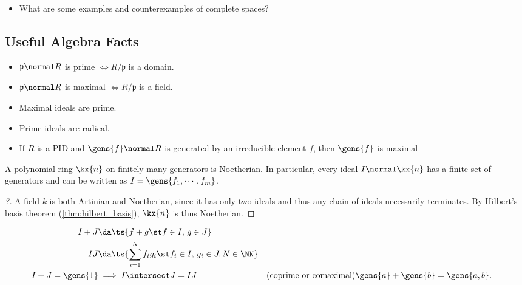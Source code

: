 \begin{itemize}
  \begin{itemize}
  \tightlist
  \item
    What are some examples and counterexamples of complete spaces?
  \end{itemize}
\end{itemize}

\newpage

\hypertarget{useful-algebra-facts}{%
\subsection{Useful Algebra Facts}\label{useful-algebra-facts}}

\begin{fact}

\envlist

\begin{itemize}
\tightlist
\item
  \(\mathfrak{p}\normal R\) is prime \(\iff R/\mathfrak{p}\) is a
  domain.
\item
  \(\mathfrak{p}\normal R\) is maximal \(\iff R/\mathfrak{p}\) is a
  field.
\item
  Maximal ideals are prime.
\item
  Prime ideals are radical.
\item
  If \(R\) is a PID and \(\gens{f} \normal R\) is generated by an
  irreducible element \(f\), then \(\gens{f}\) is maximal
\end{itemize}

\end{fact}

\begin{proposition}

A polynomial ring \(\kx{n}\) on finitely many generators is Noetherian.
In particular, every ideal \(I\normal \kx{n}\) has a finite set of
generators and can be written as \(I = \gens{f_1, \cdots, f_m}\).

\end{proposition}

\begin{proof}[?]

A field \(k\) is both Artinian and Noetherian, since it has only two
ideals and thus any chain of ideals necessarily terminates. By Hilbert's
basis theorem (\cref{thm:hilbert_basis}), \(\kx{n}\) is thus Noetherian.

\end{proof}

\begin{proposition}

\begin{align*}  
I+J   &\da \ts{f+g \st f\in I,\, g\in J} \\
IJ    &\da \ts{\sum_{i=1}^N f_i g_i \st f_i\in I,\, g_i\in J, N\in \NN} \\
I+J   = \gens{1} 
      &\implies I\intersect J = IJ && \text{(coprime or comaximal)}
\gens{a} + \gens{b} = \gens{a, b}
.\end{align*}

\end{proposition}

